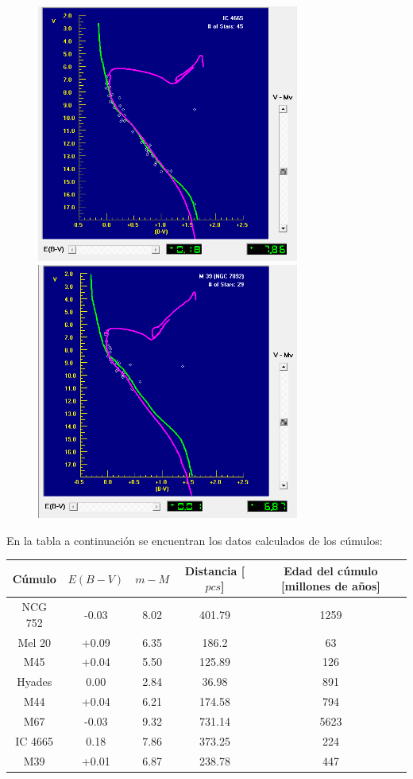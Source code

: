 \documentclass[12pt]{article}
\begin{document}
\begin{figure}[H]
    \includegraphics[width= 3.40in]{ic4665.png}
    \includegraphics[width= 3.40in]{M39.png}
  \label{hrmetal}
\end{figure}


\newpage
En la tabla a continuación se encuentran los datos calculados de los cúmulos:

\begin{table}[htb]
    \centering
    \label{tabla}
	\begin{tabular}{|c|c|c|c|c| }
	\hline
	Cúmulo & $E(B-V)$ & $m-M$ & Distancia [$pcs$] & Edad del cúmulo [millones de años]  \\ \hline
	NCG 752 & -0.03 & 8.02 & 401.79 & 1259  \\ \hline
	Mel 20 & +0.09 & 6.35 & 186.2 & 63  \\ \hline
	M45 & +0.04 & 5.50 & 125.89 & 126  \\ \hline
	Hyades & 0.00 & 2.84 & 36.98 & 891  \\ \hline
	M44 & +0.04 & 6.21 & 174.58 & 794  \\ \hline
	M67 & -0.03 & 9.32 & 731.14 & 5623  \\ \hline
	IC 4665 & 0.18 & 7.86 & 373.25 & 224  \\ \hline
	M39 & +0.01 & 6.87 & 238.78 & 447  \\ \hline
	\end{tabular}
\end{table}
\end{document}
